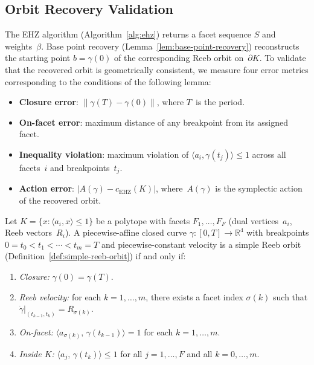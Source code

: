 %

\subsection{Orbit Recovery Validation}
\label{sec:orbit-recovery}

The EHZ algorithm (Algorithm~\ref{alg:ehz}) returns a facet
sequence $S$ and weights~$\beta$.
Base point recovery (Lemma~\ref{lem:base-point-recovery}) reconstructs
the starting point $b = \gamma(0)$ of the corresponding Reeb orbit
on~$\partial K$.
To validate that the recovered orbit is geometrically consistent,
we measure four error metrics corresponding to the conditions of the
following lemma:
\begin{itemize}
  \item \textbf{Closure error}: $\lVert \gamma(T) - \gamma(0) \rVert$,
    where $T$~is the period.
  \item \textbf{On-facet error}: maximum distance of any breakpoint
    from its assigned facet.
  \item \textbf{Inequality violation}: maximum violation of
    $\langle a_i, \gamma(t_j) \rangle \le 1$ across all facets~$i$
    and breakpoints~$t_j$.
  \item \textbf{Action error}: $\lvert A(\gamma) - c_{\mathrm{EHZ}}(K) \rvert$,
    where~$A(\gamma)$ is the symplectic action of the recovered orbit.
\end{itemize}
\begin{lemma}%
\label{lem:finite-orbit-verification}
Let $K = \{x : \langle a_i, x \rangle \le 1\}$ be a polytope with
facets $F_1, \ldots, F_F$ (dual vertices~$a_i$, Reeb vectors~$R_i$).
A piecewise-affine closed curve $\gamma \colon [0, T] \to \mathbb{R}^4$
with breakpoints $0 = t_0 < t_1 < \cdots < t_m = T$ and
piecewise-constant velocity
is a simple Reeb orbit (Definition~\ref{def:simple-reeb-orbit})
if and only if:
\begin{enumerate}
  \item \emph{Closure:}
    $\gamma(0) = \gamma(T)$.
  \item \emph{Reeb velocity:}
    for each $k = 1, \ldots, m$, there exists a facet index
    $\sigma(k)$ such that
    $\dot{\gamma}|_{(t_{k-1}, t_k)} = R_{\sigma(k)}$.
  \item \emph{On-facet:}
    $\langle a_{\sigma(k)},\, \gamma(t_{k-1}) \rangle = 1$
    for each $k = 1, \ldots, m$.
  \item \emph{Inside $K$:}
    $\langle a_j,\, \gamma(t_k) \rangle \le 1$
    for all $j = 1, \ldots, F$ and all $k = 0, \ldots, m$.
\end{enumerate}
\end{lemma}

